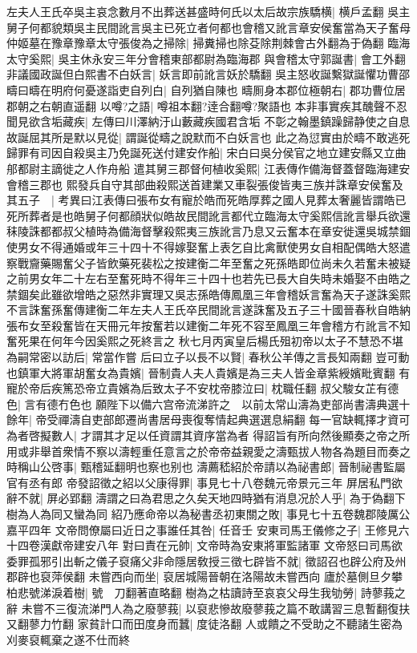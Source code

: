 左夫人王氏卒吳主哀念數月不出葬送甚盛時何氏以太后故宗族驕横|{
	横戶孟翻}
吳主舅子何都貌類吳主民間訛言吳主已死立者何都也會稽又訛言章安侯奮當為天子奮母仲姬墓在豫章豫章太守張俊為之掃除|{
	掃糞掃也除芟除荆棘會古外翻為于偽翻}
臨海太守奚熙|{
	吳主休永安三年分會稽東部都尉為臨海郡}
與會稽太守郭誕書|{
	會工外翻}
非議國政誕但白熙書不白妖言|{
	妖言即前訛言妖於驕翻}
吳主怒收誕繫獄誕懼功曹邵疇曰疇在明府何憂遂詣吏自列白|{
	自列猶自陳也}
疇厠身本郡位極朝右|{
	郡功曹位居郡朝之右朝直遥翻}
以噂?之語|{
	噂祖本翻?逹合翻噂?聚語也}
本非事實疾其醜聲不忍聞見欲含垢藏疾|{
	左傳曰川澤納汙山藪藏疾國君含垢}
不彰之翰墨鎮躁歸静使之自息故誕屈其所是默以見從|{
	謂誕從疇之說默而不白妖言也}
此之為愆實由於疇不敢逃死歸罪有司因自殺吳主乃免誕死送付建安作船|{
	宋白曰吳分侯官之地立建安縣又立曲郍都尉主謫徙之人作舟船}
遣其舅三郡督何植收奚熙|{
	江表傳作備海督蓋督臨海建安會稽三郡也}
熙發兵自守其部曲殺熙送首建業又車裂張俊皆夷三族并誅章安侯奮及其五子　|{
	考異曰江表傳曰張布女有寵於皓而死皓厚葬之國人見葬太奢麗皆謂皓已死所葬者是也皓舅子何都顔狀似皓故民間訛言都代立臨海太守奚熙信訛言舉兵欲還秣陵誅都都叔父植時為備海督擊殺熙夷三族訛言乃息又云奮本在章安徙還吳城禁錮使男女不得通婚或年三十四十不得嫁娶奮上表乞自比禽獸使男女自相配偶皓大怒遣察戰齎藥賜奮父子皆飲藥死裴松之按建衡二年至奮之死孫皓即位尚未久若奮未被疑之前男女年二十左右至奮死時不得年三十四十也若先已長大自失時未婚娶不由皓之禁錮矣此雖欲增皓之惡然非實理又吳志孫皓傳鳳凰三年會稽妖言奮為天子遂誅奚熙不言誅奮孫奮傳建衡二年左夫人王氏卒民間訛言遂誅奮及五子三十國晉春秋自皓納張布女至殺奮皆在天冊元年按奮若以建衡二年死不容至鳳凰三年會稽方冇訛言不知奮死果在何年今因奚熙之死終言之}
秋七月丙寅皇后楊氏殂初帝以太子不慧恐不堪為嗣常密以訪后|{
	常當作嘗}
后曰立子以長不以賢|{
	春秋公羊傳之言長知兩翻}
豈可動也鎮軍大將軍胡奮女為貴嬪|{
	晉制貴人夫人貴嬪是為三夫人皆金章紫綬嬪毗賓翻}
有寵於帝后疾篤恐帝立貴嬪為后致太子不安枕帝膝泣曰|{
	枕職任翻}
叔父駿女芷有德色|{
	言有德冇色也}
願陛下以備六宫帝流涕許之　以前太常山濤為吏部尚書濤典選十餘年|{
	帝受禪濤自吏部郎遷尚書居母喪復奪情起典選選息絹翻}
每一官缺輒擇才資可為者啓擬數人|{
	才謂其才足以任資謂其資序當為者}
得詔旨有所向然後顯奏之帝之所用或非舉首衆情不察以濤輕重任意言之於帝帝益親愛之濤甄拔人物各為題目而奏之時稱山公啓事|{
	甄稽延翻明也察也别也}
濤薦嵇紹於帝請以為祕書郎|{
	晉制祕書監屬官有丞有郎}
帝發詔徵之紹以父康得罪|{
	事見七十八卷魏元帝景元三年}
屏居私門欲辭不就|{
	屏必郢翻}
濤謂之曰為君思之久矣天地四時猶有消息况於人乎|{
	為于偽翻下樹為人為同又蠻為同}
紹乃應命帝以為秘書丞初東關之敗|{
	事見七十五卷魏郡陵厲公嘉平四年}
文帝問僚屬曰近日之事誰任其咎|{
	任音壬}
安東司馬王儀修之子|{
	王修見六十四卷漢獻帝建安八年}
對曰責在元帥|{
	文帝時為安東將軍監諸軍}
文帝怒曰司馬欲委罪孤邪引出斬之儀子裒痛父非命隱居敎授三徵七辟皆不就|{
	徵詔召也辟公府及州郡辟也裒萍侯翻}
未嘗西向而坐|{
	裒居城陽晉朝在洛陽故未嘗西向}
廬於墓側旦夕攀柏悲號涕淚着樹|{
	號　刀翻著直略翻}
樹為之枯讀詩至哀哀父母生我劬勞|{
	詩蓼莪之辭}
未嘗不三復流涕門人為之廢蓼莪|{
	以裒悲慘故廢蓼莪之篇不敢講習三息暫翻復扶又翻蓼力竹翻}
家貧計口而田度身而蠶|{
	度徒洛翻}
人或饋之不受助之不聽諸生密為刈麥裒輒棄之遂不仕而終


